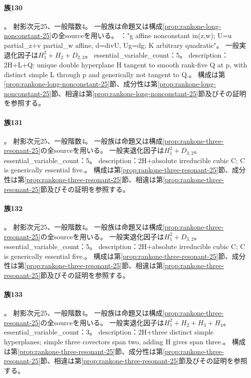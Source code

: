 \paragraph{族130}\label{catalogue:R4_MODULAR_RANK1_LONG_NONCONSTANT_25}
。
射影次元$25$、一般階数$4$。
一般族は命題又は構成\ref{prop:rankone-long-nonconstant-25}の全sourceを用いる。
："g affine nonconstant in(z,w); U=u partial\_z+v partial\_w affine, d=divU, Ug=dg; K arbitrary quadratic"。
一般実退化因子は$H_{1}^{2}+H_{2}+D_{2,3}$。
essential\_variable\_count：5。
description：2H+L+Q: unique double hyperplane H tangent to smooth rank-five Q at p, with distinct simple L through p and generically not tangent to Q.。
構成は第\ref{prop:rankone-long-nonconstant-25}節、成分性は第\ref{prop:rankone-long-nonconstant-25}節、相違は第\ref{prop:rankone-long-nonconstant-25}節及びその証明を参照する。

\paragraph{族131}\label{catalogue:R4_MODULAR_RANK1_LONG_CONST_MU1_25}
。
射影次元$25$、一般階数$4$。
一般族は命題又は構成\ref{prop:rankone-three-resonant-25}の全sourceを用いる。
一般実退化因子は$H_{1}^{2}+D_{3,2}$。
essential\_variable\_count：5。
description：2H+absolute irreducible cubic C; C is generically essential five.。
構成は第\ref{prop:rankone-three-resonant-25}節、成分性は第\ref{prop:rankone-three-resonant-25}節、相違は第\ref{prop:rankone-three-resonant-25}節及びその証明を参照する。

\paragraph{族132}\label{catalogue:R4_MODULAR_RANK1_LONG_CONST_MU13_25}
。
射影次元$25$、一般階数$4$。
一般族は命題又は構成\ref{prop:rankone-three-resonant-25}の全sourceを用いる。
一般実退化因子は$H_{1}^{2}+D_{3,2}$。
essential\_variable\_count：5。
description：2H+absolute irreducible cubic C; C is generically essential five.。
構成は第\ref{prop:rankone-three-resonant-25}節、成分性は第\ref{prop:rankone-three-resonant-25}節、相違は第\ref{prop:rankone-three-resonant-25}節及びその証明を参照する。

\paragraph{族133}\label{catalogue:R4_MODULAR_RANK1_LONG_ZERO_SCALAR_CUBIC_25}
。
射影次元$25$、一般階数$4$。
一般族は命題又は構成\ref{prop:rankone-three-resonant-25}の全sourceを用いる。
一般実退化因子は$H_{1}^{2}+H_{2}+H_{3}+H_{4}$。
essential\_variable\_count：3。
description：2H+three distinct simple hyperplanes; simple three covectors span two, adding H gives span three.。
構成は第\ref{prop:rankone-three-resonant-25}節、成分性は第\ref{prop:rankone-three-resonant-25}節、相違は第\ref{prop:rankone-three-resonant-25}節及びその証明を参照する。

